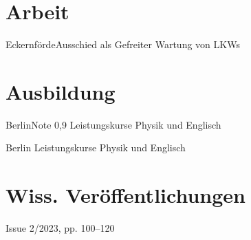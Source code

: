 \documentclass{moderncv}
\begin{document}
\maketitle

\section{Arbeit}

{Eckernförde}{Ausschied als Gefreiter}
{Wartung von LKWs}

\section{Ausbildung}

{Berlin}{Note 0,9}
{Leistungskurse Physik und Englisch}

{Berlin}{}
{Leistungskurse Physik und Englisch}

\section{Wiss. Veröffentlichungen}

{Issue 2/2023, pp. 100--120}{}
{\blindtext}
\end{document}
